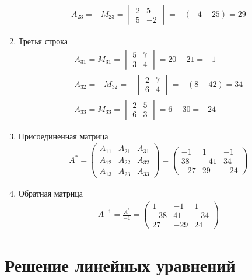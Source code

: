 \documentclass{article}
\begin{document}
\begin{enumerate}
\begin{gather*}
		A_{23} = -M_{23} = \begin{vmatrix}
			2 & 5 \\
			5 & -2
		\end{vmatrix} = -(-4 - 25) = 29
	\end{gather*}
	\item Третья строка
	\begin{gather*}
		A_{31} = M_{31} = \begin{vmatrix}
			5 & 7 \\
			3 & 4
		\end{vmatrix} = 20 - 21 = -1 \\
		A_{32} = -M_{32} = -\begin{vmatrix}
			2 & 7 \\
			6 & 4
		\end{vmatrix} = -(8 - 42) = 34 \\
		A_{33} = M_{33} = \begin{vmatrix}
			2 & 5 \\
			6 & 3
		\end{vmatrix} = 6 - 30 = -24
	\end{gather*}
	\item Присоединенная матрица
	\begin{gather*}
		A^* = \begin{pmatrix}
			A_11 & A_21 & A_31 \\
			A_12 & A_22 & A_32 \\
			A_13 & A_23 & A_33
		\end{pmatrix} = \begin{pmatrix}
			-1 & 1 & -1 \\
			38 & -41 & 34 \\
			-27 & 29 & -24
		\end{pmatrix}
	\end{gather*}
	\item Обратная матрица
	\begin{gather*}
		A^{-1} = \frac{A^*}{-1} = \begin{pmatrix}
			1 & -1 & 1 \\
			-38 & 41 & -34 \\
			27 & -29 & 24
		\end{pmatrix}
	\end{gather*}
\end{enumerate}




\pagebreak
\section{Решение линейных уравнений}
\end{document}

